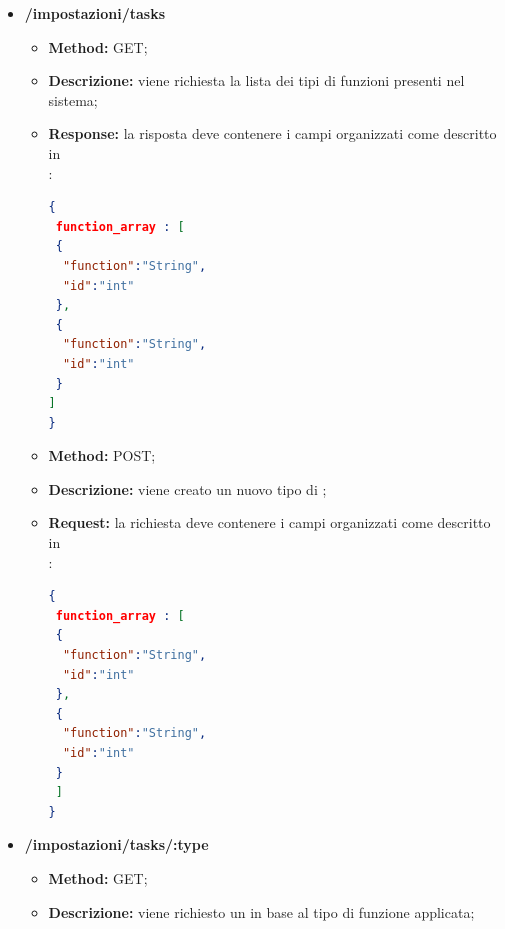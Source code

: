 \begin{itemize}


\item \textbf{/impostazioni/tasks}\\

\begin{itemize}
\item \textbf{Method:} GET; 
\item \textbf{Descrizione:} viene richiesta la lista dei tipi di funzioni presenti nel sistema; 
\item \textbf{Response:} la risposta deve contenere i campi organizzati come descritto in \\:
\begin{lstlisting}[language=json,firstnumber=1]
{
 function_array : [
 {
  "function":"String",
  "id":"int"
 },
 {
  "function":"String",
  "id":"int"
 }
]
}
\end{lstlisting}
\end{itemize}

\begin{itemize}
\item \textbf{Method:} POST;
\item \textbf{Descrizione:} viene creato un nuovo tipo di ;
\item \textbf{Request:} la richiesta deve contenere i campi organizzati come descritto in \\:
\begin{lstlisting}[language=json,firstnumber=1]
{
 function_array : [
 {
  "function":"String",
  "id":"int"
 },
 {
  "function":"String",
  "id":"int"
 }
 ]
}
\end{lstlisting}  
\end{itemize}



\item \textbf{/impostazioni/tasks/:type}\\

\begin{itemize}
\item \textbf{Method:} GET;
\item \textbf{Descrizione:} viene richiesto un  in base al tipo di funzione applicata;


\end{itemize}
\end{itemize}
